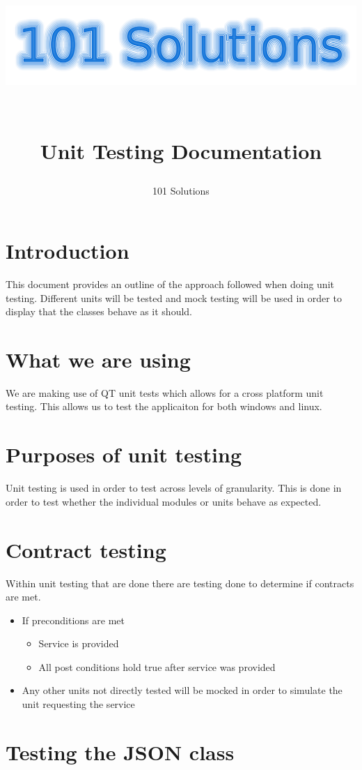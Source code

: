\documentclass[a4paper,12pt,final]{article}
\title{
\begin{center}
  	\includegraphics[scale=0.3]{101Logo.png} 
  \end{center}
  \textbf{\\}
Unit Testing Documentation\\
}
\author{101 Solutions}
\begin{document}
\maketitle
\thispagestyle{empty}
\newpage
\tableofcontents
\thispagestyle{empty}
\newpage
{}

\section{Introduction}
This document provides an outline of the approach followed when doing unit testing. Different units will be tested and mock testing will be used in order to display that the classes behave as it should.

\section{What we are using}
We are making use of QT unit tests which allows for a cross platform unit testing. This allows us to test the applicaiton for both windows and linux.

\section{Purposes of unit testing}
Unit testing is used in order to test across levels of granularity. This is done in order to test whether the individual modules or units behave as expected.



\section{Contract testing}
Within unit testing that are done there are testing done to determine if contracts are met. 
\begin{itemize}
\item If preconditions are met
\begin{itemize}
\item Service is provided
\item All post conditions hold true after service was provided
\end{itemize}
\item Any other units not directly tested will be mocked in order to simulate the unit requesting the service
\end{itemize}





\section{Testing the JSON class}
\end{document}
